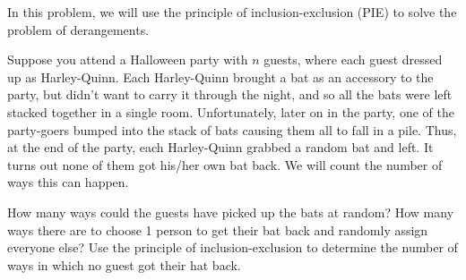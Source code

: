 \documentclass[12pt,twoside]{article}
\begin{document}
\begin{problem}{15}
In this problem, we will use the principle of inclusion-exclusion (PIE) to solve the problem of derangements.  

Suppose you attend a Halloween party with $n$ guests, where each guest dressed up as Harley-Quinn.  Each Harley-Quinn brought a bat as an accessory to the party, but didn't want to carry it through the night, and so all the bats were left stacked together in a single room.  Unfortunately, later on in the party, one of the party-goers bumped into the stack of bats causing them all to fall in a pile.  Thus, at the end of the party, each Harley-Quinn grabbed a random bat and left.  It turns out none of them got his/her own bat  back.  We will count the number of ways this can happen.

\bparts
{} How many ways could the guests have picked up the bats at random?
 How many ways there are to choose 1 person to get their bat back and randomly assign everyone else?
 Use the principle of inclusion-exclusion to determine the number of ways in which no guest got their hat back.

\eparts


\end{problem}
\end{document}

